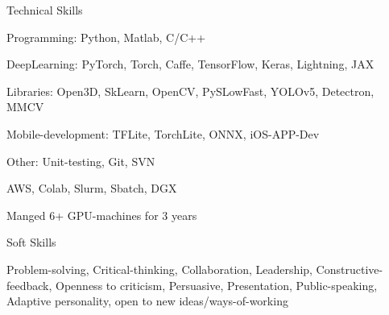 \documentclass{resume} %
\begin{document}
\begin{paracol}{2}
\begin{rSection}{Technical Skills}{} 
\begin{sSubsection}{{Programming}: Python, Matlab, C/C++}\end{sSubsection}
\begin{sSubsection}{{DeepLearning}: PyTorch, Torch, Caffe, TensorFlow, Keras, Lightning, JAX}\end{sSubsection}
\begin{sSubsection}{{Libraries}: Open3D, SkLearn, OpenCV, PySLowFast, YOLOv5, Detectron, MMCV}\end{sSubsection}
\begin{sSubsection}{{Mobile-development}: TFLite, TorchLite, ONNX, iOS-APP-Dev}\end{sSubsection}
\begin{sSubsection}{{Other}: Unit-testing, Git, SVN}\end{sSubsection} %
\begin{sSubsection}{AWS, Colab, Slurm, Sbatch, DGX}\end{sSubsection}
\begin{sSubsection}{Manged 6+ GPU-machines for 3 years}\end{sSubsection}
\end{rSection}

\begin{rSection}{Soft Skills}{} 
  \begin{sSubsection}{Problem-solving, Critical-thinking, Collaboration, Leadership, 
  Constructive-feedback, Openness to criticism, Persuasive, Presentation, Public-speaking, Adaptive personality, open to new ideas/ways-of-working}\end{sSubsection}
    

\end{rSection}
\end{paracol}
\end{document}
